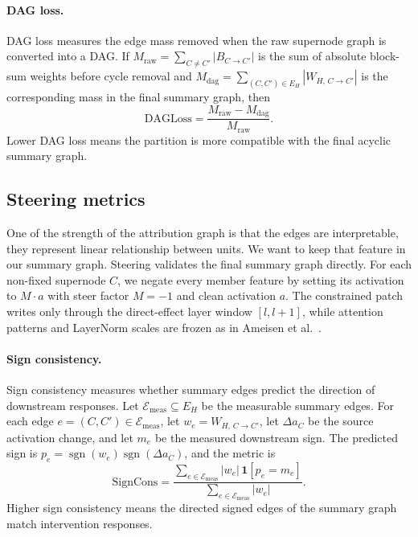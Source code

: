 \documentclass[../main.tex]{subfiles}
\begin{document}
\paragraph{DAG loss.}
DAG loss measures the edge mass removed when the raw supernode graph is converted
into a DAG. If $M_{\text{raw}}=\sum_{C\ne C'} |B_{C\to C'}|$ is the sum of
absolute block-sum weights before cycle removal and
$M_{\text{dag}}=\sum_{(C,C')\in E_H}|W_{H,\,C\to C'}|$ is the corresponding
mass in the final summary graph, then
\begin{equation}
\mathrm{DAGLoss}
=
\frac{M_{\text{raw}} - M_{\text{dag}}}{M_{\text{raw}}}.
\label{eq:metric-dagloss}
\end{equation}
Lower DAG loss means the partition is more compatible with the final acyclic
summary graph.

\subsection{Steering metrics}
One of the strength of the attribution graph is that the edges are interpretable, they represent linear 
relationship between units. We want to keep that feature in our summary graph.
Steering validates the final summary graph directly. For each non-fixed
supernode $C$, we negate every member feature by setting its activation to
$M \cdot a$ with steer factor $M=-1$ and clean activation $a$. The constrained
patch writes only through the direct-effect layer window $[l,l+1]$, while
attention patterns and LayerNorm scales are frozen as in Ameisen et
al.~\cite{ameisen2025circuit}.

\paragraph{Sign consistency.}
Sign consistency measures whether summary edges predict the direction of
downstream responses. Let $\mathcal{E}_{\text{meas}}\subseteq E_H$ be the
measurable summary edges. For each edge $e=(C,C')\in\mathcal{E}_{\text{meas}}$,
let $w_e = W_{H,\,C\to C'}$, let $\Delta a_C$ be the source activation change,
and let $m_e$ be the measured downstream sign. The predicted sign is
$p_e=\operatorname{sgn}(w_e)\operatorname{sgn}(\Delta a_C)$, and the metric is
\begin{equation}
\mathrm{SignCons}
=
\frac{\sum_{e\in\mathcal{E}_{\text{meas}}} |w_e|\,\mathbf{1}[p_e=m_e]}
     {\sum_{e\in\mathcal{E}_{\text{meas}}} |w_e|}.
\label{eq:metric-signcons}
\end{equation}
Higher sign consistency means the directed signed edges of the summary graph
match intervention responses.
\end{document}

